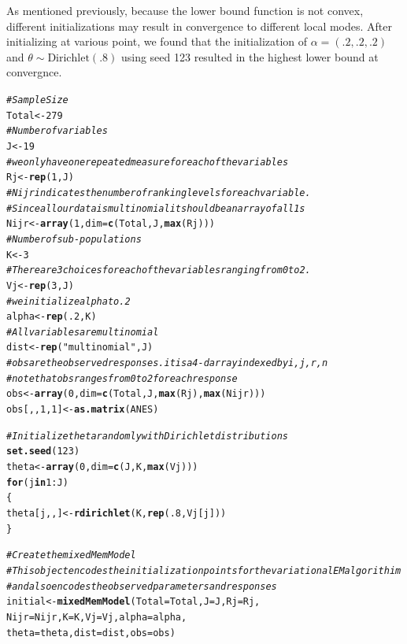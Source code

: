 \documentclass{article}\usepackage[]{graphicx}\usepackage[]{color}
\makeatletter
\newcommand{\hlnum}[1]{\textcolor[rgb]{0.686,0.059,0.569}{#1}}%
\newcommand{\hlstr}[1]{\textcolor[rgb]{0.192,0.494,0.8}{#1}}%
\newcommand{\hlcom}[1]{\textcolor[rgb]{0.678,0.584,0.686}{\textit{#1}}}%
\newcommand{\hlopt}[1]{\textcolor[rgb]{0,0,0}{#1}}%
\newcommand{\hlstd}[1]{\textcolor[rgb]{0.345,0.345,0.345}{#1}}%
\newcommand{\hlkwa}[1]{\textcolor[rgb]{0.161,0.373,0.58}{\textbf{#1}}}%
\newcommand{\hlkwb}[1]{\textcolor[rgb]{0.69,0.353,0.396}{#1}}%
\newcommand{\hlkwc}[1]{\textcolor[rgb]{0.333,0.667,0.333}{#1}}%
\newcommand{\hlkwd}[1]{\textcolor[rgb]{0.737,0.353,0.396}{\textbf{#1}}}%
\newenvironment{kframe}{%
 \def\at@end@of@kframe{}%
 \ifinner\ifhmode%
  \def\at@end@of@kframe{\end{minipage}}%
  \begin{minipage}{\columnwidth}%
 \fi\fi%
 \def\FrameCommand##1{\hskip\@totalleftmargin \hskip-\fboxsep
 \colorbox{shadecolor}{##1}\hskip-\fboxsep
     \hskip-\linewidth \hskip-\@totalleftmargin \hskip\columnwidth}%
 \MakeFramed {\advance\hsize-\width
   \@totalleftmargin\z@ \linewidth\hsize
   \@setminipage}}%
 {\par\unskip\endMakeFramed%
 \at@end@of@kframe}
\newenvironment{knitrout}{}{} %
\renewenvironment{knitrout}{\begin{singlespace}}{\end{singlespace}}
\makeatother
\begin{document}
As mentioned previously, because the lower bound function is not convex, different initializations may result in convergence to different local modes. After initializing at various point, we found that the initialization of $\alpha = \left(.2, .2, .2\right)$ and $\theta \sim \text{Dirichlet}(.8)$ using seed 123 resulted in the highest lower bound at convergnce.  

\begin{knitrout}
\color{fgcolor}\begin{kframe}
\begin{alltt}
\hlcom{# Sample Size}
\hlstd{Total} \hlkwb{<-} \hlnum{279}
\hlcom{# Number of variables}
\hlstd{J} \hlkwb{<-} \hlnum{19}
\hlcom{# we only have one repeated measure for each of the variables}
\hlstd{Rj} \hlkwb{<-} \hlkwd{rep}\hlstd{(}\hlnum{1}\hlstd{, J)}
\hlcom{# Nijr indicates the number of ranking levels for each variable.}
\hlcom{# Since all our data is multinomial it should be an array of all 1s}
\hlstd{Nijr} \hlkwb{<-} \hlkwd{array}\hlstd{(}\hlnum{1}\hlstd{,} \hlkwc{dim} \hlstd{=} \hlkwd{c}\hlstd{(Total, J,} \hlkwd{max}\hlstd{(Rj)))}
\hlcom{# Number of sub-populations}
\hlstd{K} \hlkwb{<-} \hlnum{3}
\hlcom{# There are 3 choices for each of the variables ranging from 0 to 2.}
\hlstd{Vj} \hlkwb{<-} \hlkwd{rep}\hlstd{(}\hlnum{3}\hlstd{, J)}
\hlcom{# we initialize alpha to .2}
\hlstd{alpha} \hlkwb{<-} \hlkwd{rep}\hlstd{(}\hlnum{.2}\hlstd{, K)}
\hlcom{# All variables are multinomial}
\hlstd{dist} \hlkwb{<-} \hlkwd{rep}\hlstd{(}\hlstr{"multinomial"}\hlstd{, J)}
\hlcom{# obs are the observed responses. it is a 4-d array indexed by i,j,r,n}
\hlcom{# note that obs ranges from 0 to 2 for each response}
\hlstd{obs} \hlkwb{<-} \hlkwd{array}\hlstd{(}\hlnum{0}\hlstd{,} \hlkwc{dim} \hlstd{=} \hlkwd{c}\hlstd{(Total, J,} \hlkwd{max}\hlstd{(Rj),} \hlkwd{max}\hlstd{(Nijr)))}
\hlstd{obs[,,}\hlnum{1}\hlstd{,}\hlnum{1}\hlstd{]} \hlkwb{<-} \hlkwd{as.matrix}\hlstd{(ANES)}

\hlcom{# Initialize theta randomly with Dirichlet distributions}
\hlkwd{set.seed}\hlstd{(}\hlnum{123}\hlstd{)}
\hlstd{theta} \hlkwb{<-} \hlkwd{array}\hlstd{(}\hlnum{0}\hlstd{,} \hlkwc{dim}\hlstd{=} \hlkwd{c}\hlstd{(J,K,}\hlkwd{max}\hlstd{(Vj)))}
\hlkwa{for}\hlstd{(j} \hlkwa{in} \hlnum{1}\hlopt{:}\hlstd{J)}
\hlstd{\{}
    \hlstd{theta[j,,]} \hlkwb{<-} \hlkwd{rdirichlet}\hlstd{(K,}\hlkwd{rep}\hlstd{(}\hlnum{.8}\hlstd{,Vj[j]))}
\hlstd{\}}

\hlcom{# Create the mixedMemModel}
\hlcom{# This object encodes the initialization points for the variational EM algorithim}
\hlcom{# and also encodes the observed parameters and responses}
\hlstd{initial} \hlkwb{<-} \hlkwd{mixedMemModel}\hlstd{(}\hlkwc{Total} \hlstd{= Total,} \hlkwc{J} \hlstd{= J,} \hlkwc{Rj} \hlstd{= Rj,}
                         \hlkwc{Nijr} \hlstd{= Nijr,} \hlkwc{K} \hlstd{= K,} \hlkwc{Vj} \hlstd{= Vj,} \hlkwc{alpha} \hlstd{= alpha,}
                         \hlkwc{theta} \hlstd{= theta,} \hlkwc{dist} \hlstd{= dist,} \hlkwc{obs} \hlstd{= obs)}
\end{alltt}
\end{kframe}
\end{knitrout}
\end{document}
